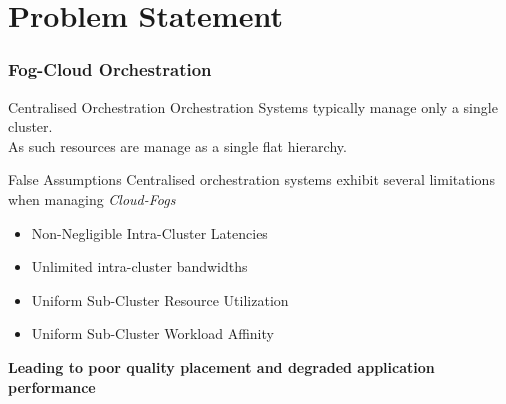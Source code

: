 \documentclass{beamer}
\begin{document}
\section{Problem Statement}
	\begin{frame}
		\frametitle{Fog-Cloud Orchestration}
		\begin{block}{Centralised Orchestration}
			Orchestration Systems typically manage only a single cluster.\\
			As such resources are manage as a single flat hierarchy.\\
		\end{block}
	
		\begin{alertblock}{False Assumptions}
			Centralised orchestration systems exhibit several limitations when managing \textit{Cloud-Fogs} 
			\begin{itemize}
				\item Non-Negligible Intra-Cluster Latencies
				\item Unlimited intra-cluster bandwidths
				\item Uniform Sub-Cluster Resource Utilization
				\item Uniform Sub-Cluster Workload Affinity
			\end{itemize}
		\end{alertblock}
	
		\begin{alertblock}{\centering \textbf{Leading to poor quality placement and degraded application performance}}
		\end{alertblock}
	\end{frame}
\end{document}
